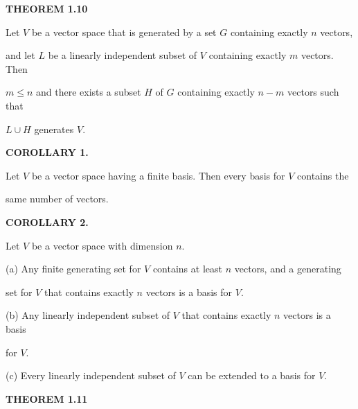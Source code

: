 \documentclass[12pt, a4paper]{article}
\begin{document}
  \noindent\blacksquare\textbf{ THEOREM 1.10}
  
  \vspace{2mm}
  
  Let $V$ be a vector space that is generated by a set $G$ containing exactly $n$ vectors,\par and let $L$ be a linearly independent subset of $V$ containing exactly $m$ vectors. Then\par $m\leq n$ and there exists a subset $H$ of $G$ containing exactly $n-m$ vectors such that\par $L\cup H$ generates $V$.
  
  \vspace{4mm}
  
  \noindent\blacktriangle\textbf{ COROLLARY 1.}
  
  \vspace{2mm}
  
  Let $V$ be a vector space having a finite basis. Then every basis for $V$ contains the\par same number of vectors.
  
  \vspace{4mm}
  
  \noindent\blacktriangle\textbf{ COROLLARY 2.}
  
  \vspace{2mm}
  
  Let $V$ be a vector space with dimension $n$.
  
  \vspace{2mm}
  
  \begin{addmargin}[1.5em]{1.5em}
  
    (a) Any finite generating set for $V$ contains at least $n$ vectors, and a generating\par set for $V$ that contains exactly $n$ vectors is a basis for $V$.\par
    \noindent(b) Any linearly independent subset of $V$ that contains exactly $n$ vectors is a basis\par for $V$.\par
    \noindent(c) Every linearly independent subset of $V$ can be extended to a basis for $V$.
  
  \end{addmargin}
  
  \vspace{4mm}
  
  \noindent\blacksquare\textbf{ THEOREM 1.11}
  
\end{document}
